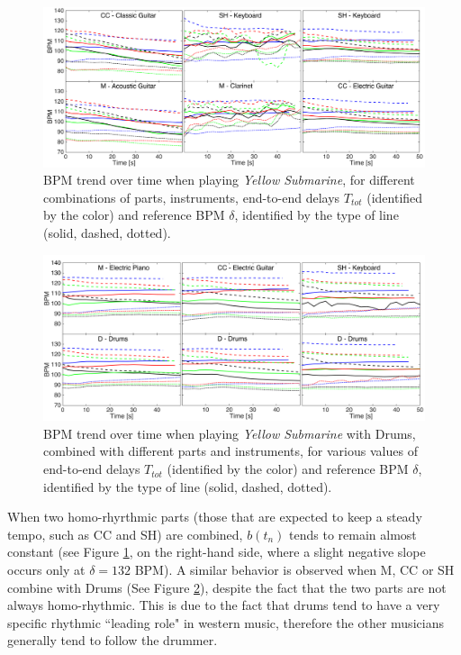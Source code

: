 \begin{figure}[!tb]
  \centering
  \includegraphics[width=\textwidth]{img/NMP/fig1_wider}
  \caption{BPM trend over time when playing \textit{Yellow Submarine}, for different combinations of parts, instruments,  end-to-end delays $T_{tot}$ (identified by the color) and reference BPM $\delta$, identified by the type of line (solid, dashed, dotted).}
   \label{fig:NMP:melody} 
\end{figure}
\begin{figure}[!tb]
  \centering
  \includegraphics[width=\textwidth]{img/NMP/fig2_wider}
  \caption{BPM trend over time when playing \textit{Yellow Submarine} with Drums, combined with different parts and instruments, for various values of end-to-end delays $T_{tot}$ (identified by the color) and reference BPM $\delta$, identified by the type of line (solid, dashed, dotted).}
 \label{fig:NMP:drums} 
\end{figure}


%


When two homo-rhyrthmic parts (those that are expected to keep a steady tempo, such as CC and SH) are combined, $b(t_n)$ tends to remain almost constant (see Figure \ref{fig:NMP:melody}, on the right-hand side, where a slight negative slope occurs only at $\delta=132$ BPM).
A similar behavior is observed when M, CC or SH combine with Drums (See Figure \ref{fig:NMP:drums}), despite the fact that the two parts are not always homo-rhythmic. This is due to the fact that drums tend to have a very specific rhythmic ``leading role" in western music, therefore the other musicians generally tend to follow the drummer.

